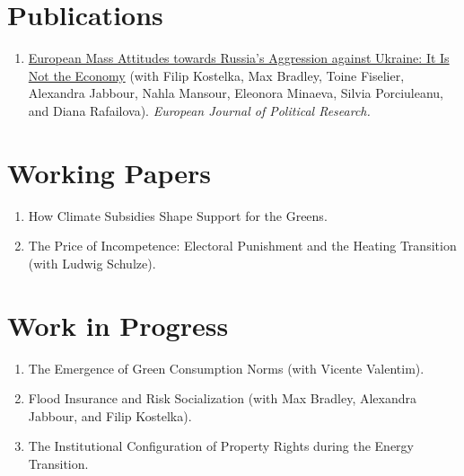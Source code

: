 \documentclass[11pt,letterpaper]{article}
\begin{document}
\section{Publications}

\begin{enumerate}
  \item \href{https://www.researchgate.net/publication/403049733_Mass_Attitudes_towards_Russia's_Aggression_against_Ukraine_Tentative_Support_for_Top-Down_Opinion_Formation}{European Mass Attitudes towards Russia's Aggression against Ukraine: It Is Not the Economy}
  (with Filip Kostelka, Max Bradley, Toine Fiselier, Alexandra Jabbour, Nahla Mansour, Eleonora Minaeva, Silvia Porciuleanu, and Diana Rafailova).
  {\color{muted}\emph{European Journal of Political Research.}}
\end{enumerate}


\section{Working Papers}

\begin{enumerate}
  \item How Climate Subsidies Shape Support for the Greens.
  \item The Price of Incompetence: Electoral Punishment and the Heating Transition {\color{muted}(with Ludwig Schulze)}.
\end{enumerate}


\section{Work in Progress}

\begin{enumerate}
  \item The Emergence of Green Consumption Norms {\color{muted}(with Vicente Valentim)}.
  \item Flood Insurance and Risk Socialization {\color{muted}(with Max Bradley, Alexandra Jabbour, and Filip Kostelka)}.
  \item The Institutional Configuration of Property Rights during the Energy Transition.
\end{enumerate}
\end{document}
